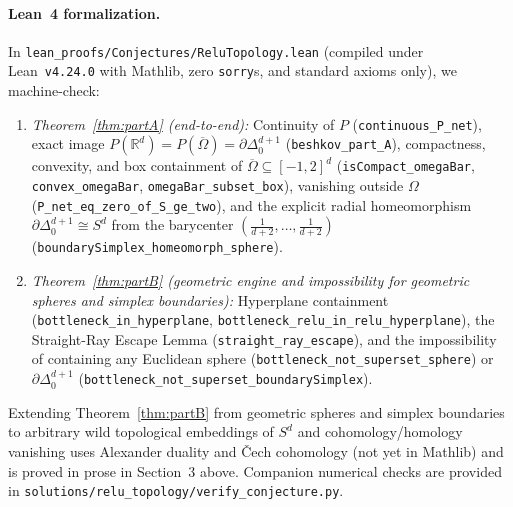 \documentclass[11pt]{article}
\theoremstyle{plain}
\theoremstyle{definition}
\theoremstyle{remark}
\begin{document}
\paragraph{Lean~4 formalization.}
In \texttt{lean\_proofs/Conjectures/ReluTopology.lean} (compiled under Lean~\texttt{v4.24.0} with Mathlib, zero \texttt{sorry}s, and standard axioms only), we machine-check:
\begin{enumerate}[label=\textup{(\arabic*)}]
\item \emph{Theorem~\ref{thm:partA} (end-to-end):} Continuity of $P$ (\texttt{continuous\_P\_net}), exact image $P(\mathbb{R}^d) = P(\overline{\Omega}) = \partial \Delta_0^{d+1}$ (\texttt{beshkov\_part\_A}), compactness, convexity, and box containment of $\overline{\Omega} \subseteq [-1, 2]^d$ (\texttt{isCompact\_omegaBar}, \texttt{convex\_omegaBar}, \texttt{omegaBar\_\allowbreak subset\_box}), vanishing outside $\Omega$ (\texttt{P\_net\_eq\_\allowbreak zero\_of\_S\_ge\_two}), and the explicit radial homeomorphism $\partial \Delta_0^{d+1} \cong S^d$ from the barycenter $(\frac{1}{d+2}, \dots, \frac{1}{d+2})$ (\texttt{boundarySimplex\_\allowbreak homeomorph\_sphere}).
\item \emph{Theorem~\ref{thm:partB} (geometric engine and impossibility for geometric spheres and simplex boundaries):} Hyperplane containment (\texttt{bottleneck\_in\_\allowbreak hyperplane}, \texttt{bottleneck\_relu\_in\_\allowbreak relu\_hyperplane}), the Straight-Ray Escape Lemma (\texttt{straight\_ray\_escape}), and the impossibility of containing any Euclidean sphere (\texttt{bottleneck\_not\_\allowbreak superset\_sphere}) or $\partial \Delta_0^{d+1}$ (\texttt{bottleneck\_not\_\allowbreak superset\_\allowbreak boundarySimplex}).
\end{enumerate}
Extending Theorem~\ref{thm:partB} from geometric spheres and simplex boundaries to arbitrary wild topological embeddings of $S^d$ and cohomology/homology vanishing uses Alexander duality and \v{C}ech cohomology (not yet in Mathlib) and is proved in prose in Section~3 above. Companion numerical checks are provided in \texttt{solutions/relu\_topology/verify\_conjecture.py}.
\end{document}
